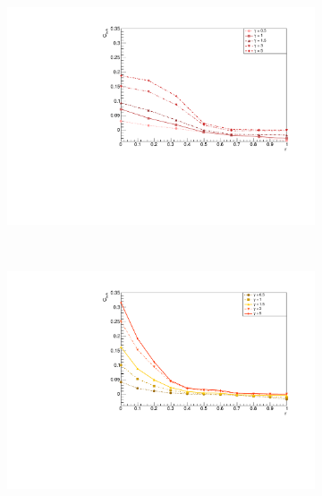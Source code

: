 \begin{figure}[H]
\centering
\begin{subfigure}{\columnwidth}
\centering
    \includegraphics[scale=0.6]{Figures/8sites/8sites_BulkCF_CONNvsGamma.pdf}
    \label{fig:8sites_LMvsGamma}
\end{subfigure}\\
\begin{subfigure}{\columnwidth}
\centering
    \includegraphics[scale=0.6]{Figures/12sites/12sites_CFBulkCONNVSgamma.pdf}
    \label{fig:12sites_LMvsGamma}
\end{subfigure}\\
\begin{subfigure}{\columnwidth}
\centering

\end{subfigure}
\end{figure}
